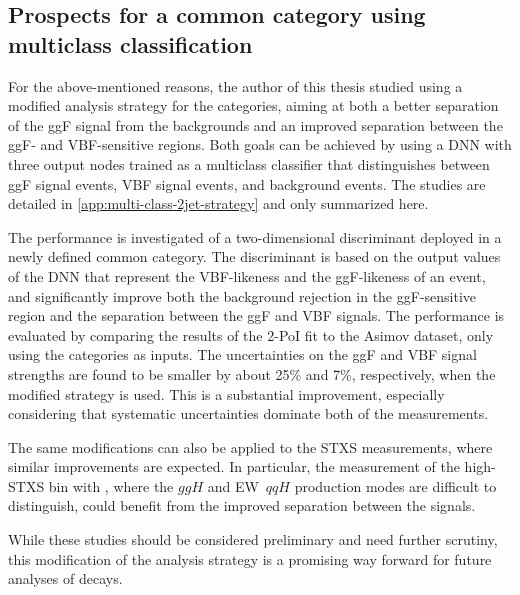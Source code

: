 \subsection{Prospects for a common \TwoJet category using multiclass classification}
For the above-mentioned reasons, the author of this thesis studied using a modified analysis strategy for the \TwoJet categories, aiming at both a better separation of the ggF signal from the backgrounds and an improved separation between the ggF- and VBF-sensitive \TwoJet regions. 
Both goals can be achieved by using a DNN with three output nodes trained as a multiclass classifier that distinguishes between ggF signal events, VBF signal events, and background events. The studies are detailed in \cref{app:multi-class-2jet-strategy} and only summarized here. 

The performance is investigated of a two-dimensional discriminant deployed in a newly defined common \TwoJet category.
The discriminant is based on the output values of the DNN that represent the VBF-likeness and the ggF-likeness of an event, and significantly improve both the background rejection in the ggF-sensitive region and the separation between the ggF and VBF signals.
The performance is evaluated by comparing the results of the 2-PoI fit to the Asimov dataset, only using the \TwoJet categories as inputs. 
The uncertainties on the ggF and VBF signal strengths are found to be smaller by about 25\% and 7\%, respectively, when the modified \TwoJet strategy is used. 
This is a substantial improvement, especially considering that systematic uncertainties dominate both of the measurements. 

The same modifications can also be applied to the STXS measurements, where similar improvements are expected. In particular, the measurement of the high-\pT STXS bin with \TwoJet, where the $ggH$ and EW~$qqH$ production modes are difficult to distinguish, could benefit from the improved separation between the signals.

While these studies should be considered preliminary and need further scrutiny, this modification of the \TwoJet analysis strategy is a promising way forward for future analyses of \HWW decays.





